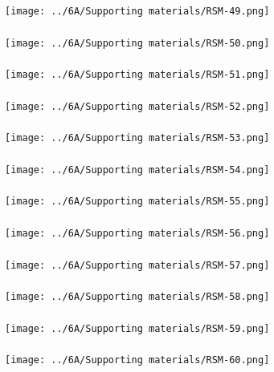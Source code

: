\begin{frame}\frametitle{}
	\centerline{\texttt{[image: ../6A/Supporting materials/RSM-49.png]}}
\end{frame}
\begin{frame}\frametitle{}
	\centerline{\texttt{[image: ../6A/Supporting materials/RSM-50.png]}}
\end{frame}
\begin{frame}\frametitle{}
	\centerline{\texttt{[image: ../6A/Supporting materials/RSM-51.png]}}
\end{frame}
\begin{frame}\frametitle{}
	\centerline{\texttt{[image: ../6A/Supporting materials/RSM-52.png]}}
\end{frame}
\begin{frame}\frametitle{}
	\centerline{\texttt{[image: ../6A/Supporting materials/RSM-53.png]}}
\end{frame}
\begin{frame}\frametitle{}
	\centerline{\texttt{[image: ../6A/Supporting materials/RSM-54.png]}}
\end{frame}
\begin{frame}\frametitle{}
	\centerline{\texttt{[image: ../6A/Supporting materials/RSM-55.png]}}
\end{frame}
\begin{frame}\frametitle{}
	\centerline{\texttt{[image: ../6A/Supporting materials/RSM-56.png]}}
\end{frame}
\begin{frame}\frametitle{}
	\centerline{\texttt{[image: ../6A/Supporting materials/RSM-57.png]}}
\end{frame}
\begin{frame}\frametitle{}
	\centerline{\texttt{[image: ../6A/Supporting materials/RSM-58.png]}}
\end{frame}
\begin{frame}\frametitle{}
	\centerline{\texttt{[image: ../6A/Supporting materials/RSM-59.png]}}
\end{frame}
\begin{frame}\frametitle{}
	\centerline{\texttt{[image: ../6A/Supporting materials/RSM-60.png]}}
\end{frame}
